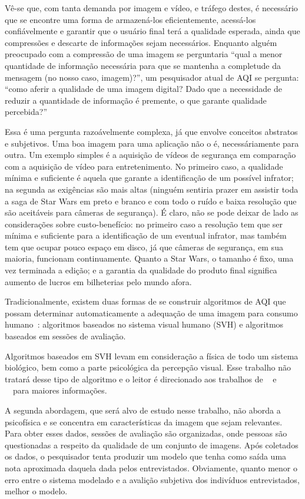 	Vê-se que, com tanta demanda por imagem e vídeo, e tráfego destes, é necessário que se encontre uma forma de armazená-los eficientemente, acessá-los confiávelmente e garantir que o usuário final terá a qualidade esperada, ainda que compressões e descarte de informações sejam necessários. Enquanto alguém preocupado com a compressão de uma imagem se perguntaria ``qual a menor quantidade de informação necessária para que se mantenha a completude da mensagem (no nosso caso, imagem)?'', um pesquisador atual de AQI se pergunta: ``como aferir a qualidade de uma imagem digital? Dado que a necessidade de reduzir a quantidade de informação é premente, o que garante qualidade percebida?''

	Essa é uma pergunta razoávelmente complexa, já que envolve conceitos abstratos e subjetivos. Uma boa imagem para uma aplicação não o é, necessáriamente para outra. Um exemplo simples é a aquisição de vídeos de segurança em comparação com a aquisição de vídeo para entretenimento. No primeiro caso, a qualidade mínima e suficiente é aquela que garante a identificação de um possível infrator; na segunda as exigências são mais altas (ninguém sentiria prazer em assistir toda a saga de Star Wars em preto e branco e com todo o ruído e baixa resolução que são aceitáveis para câmeras de segurança). É claro, não se pode deixar de lado as considerações sobre custo-benefício: no primeiro caso a resolução tem que ser mínima e suficiente para a identificação de um eventual infrator, mas também tem que ocupar pouco espaço em disco, já que câmeras de segurança, em sua maioria, funcionam continuamente. Quanto a Star Wars, o tamanho é fixo, uma vez terminada a edição; e a garantia da qualidade do produto final significa aumento de lucros em bilheterias pelo mundo afora.

	Tradicionalmente, existem duas formas de se construir algoritmos de AQI que possam determinar automaticamente a adequação de uma imagem para consumo humano~\cite{Chandler2013}: algoritmos baseados no sistema visual humano (SVH) e algoritmos baseados em sessões de avaliação.

	Algoritmos baseados em SVH levam em consideração a física de todo um sistema biológico, bem como a parte psicológica da percepção visual. Esse trabalho não tratará desse tipo de algoritmo e o leitor é direcionado aos trabalhos de ~\cite{Takemura2002} e ~\cite{Winkler-2005-Wiley}\ para maiores informações. 
	
	A segunda abordagem, que será alvo de estudo nesse trabalho, não aborda a psicofísica e se concentra em características da imagem que sejam relevantes. Para obter esses dados, sessões de avaliação são organizadas, onde pessoas são questionadas a respeito da qualidade de um conjunto de imagens. Após coletados os dados, o pesquisador tenta produzir um modelo que tenha como saída uma nota aproximada daquela dada pelos entrevistados. Obviamente, quanto menor o erro entre o sistema modelado e a avalição subjetiva dos indivíduos entrevistados, melhor o modelo.

